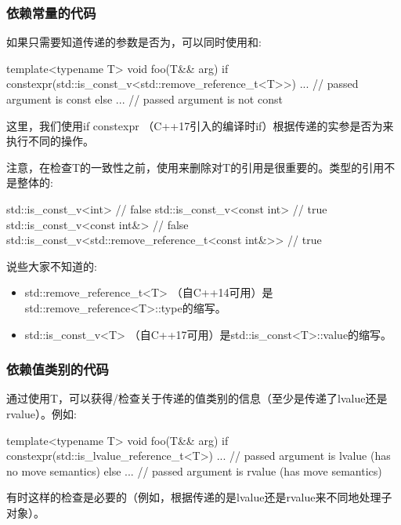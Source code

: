 \subsubsection{依赖常量的代码}

如果只需要知道传递的参数是否为，可以同时使用和:

\begin{cppcode}
template<typename T>
void foo(T&& arg)
{
	if constexpr(std::is_const_v<std::remove_reference_t<T>>) {
		... // passed argument is const
	}
	else {
		... // passed argument is not const
	}
}
\end{cppcode}

这里，我们使用if constexpr （C++17引入的编译时if）根据传递的实参是否为来执行不同的操作。

注意，在检查T的一致性之前，使用来删除对T的引用是很重要的。类型的引用不是整体的:

\begin{cppcode}
std::is_const_v<int> // false
std::is_const_v<const int> // true
std::is_const_v<const int&> // false
std::is_const_v<std::remove_reference_t<const int&>> // true
\end{cppcode}

说些大家不知道的:

\begin{itemize}
	\item std::remove_reference_t<T> （自C++14可用）是std::remove_reference<T>::type的缩写。
	\item std::is_const_v<T> （自C++17可用）是std::is_const<T>::value的缩写。
\end{itemize}

\subsubsection{依赖值类别的代码}

通过使用T，可以获得/检查关于传递的值类别的信息（至少是传递了lvalue还是rvalue）。例如:

\begin{cppcode}
template<typename T>
void foo(T&& arg)
{
	if constexpr(std::is_lvalue_reference_t<T>) {
		... // passed argument is lvalue (has no move semantics)
	}
	else {
		... // passed argument is rvalue (has move semantics)
	}
}
\end{cppcode}

有时这样的检查是必要的（例如，根据传递的是lvalue还是rvalue来不同地处理子对象）。

